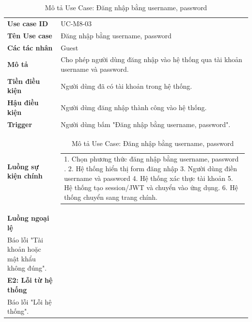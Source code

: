 \begin{longtable}{|p{4cm}|p{11cm}|}
\caption{Mô tả Use Case: Đăng nhập bằng username, password}
\label{usecase-8-04} \\
\hline
\endfirsthead
\caption[]{Mô tả Use Case: Đăng nhập bằng username, password} \\
\hline
\endhead
\textbf{Use case ID}       & UC-M8-03 \\ \hline
\textbf{Tên Use case}      & Đăng nhập bằng username, password \\ \hline
\textbf{Các tác nhân}      & Guest \\ \hline
\textbf{Mô tả}             & Cho phép người dùng đăng nhập vào hệ thống qua tài khoản username và password. \\ \hline
\textbf{Tiền điều kiện}    & Người dùng đã có tài khoản trong hệ thống. \\ \hline
\textbf{Hậu điều kiện}     & Người dùng đăng nhập thành công vào hệ thống.\\ \hline
\textbf{Trigger}    & Người dùng bấm "Đăng nhập bằng username, password". \\ \hline
\textbf{Luồng sự kiện chính} & 
\begin{tabular}[t]{@{}p{10.5cm}@{}}
1. Chọn phương thức đăng nhập bằng username, password . 
2. Hệ thống hiển thị form đăng nhập
3. Người dùng điền username và password
4. Hệ thống xác thực tài khoản
5. Hệ thống tạo session/JWT và chuyển vào ứng dụng.
6. Hệ thống chuyển sang trang chính.
\end{tabular} \\ \hline
\textbf{Luồng ngoại lệ} &
\begin{tabular}[t]{@{}p{10.5cm}@{}}
\textbf{E1: Lỗi từ người dùng}\\
Báo lỗi "Tài khoản hoặc mật khẩu không đúng". \\
\textbf{E2: Lỗi từ hệ thống}\\
Báo lỗi "Lỗi hệ thống". 
\end{tabular} \\
\hline
\end{longtable}

